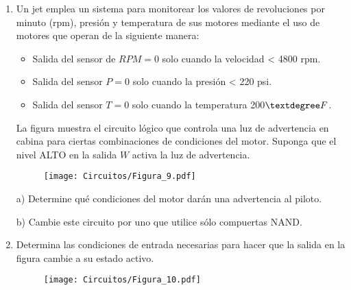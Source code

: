 \documentclass[a4paper, 12pt]{article}
\newcommand{\Aspace}{0.2cm}
\begin{document}
\begin{enumerate}
        \item Un jet emplea un sistema para monitorear los valores de revoluciones por minuto (rpm), presión y temperatura de sus motores mediante el uso de motores que operan de la siguiente manera:
        \begin{itemize}
            \item Salida del sensor de $RPM = 0$ solo cuando la velocidad < 4800 rpm.
            \item Salida del sensor $P = 0$ solo cuando la presión < 220 psi.
            \item Salida del sensor $T = 0$ solo cuando la temperatura 200$\textdegree F$.
        \end{itemize}
        La figura muestra el circuito lógico que controla una luz de advertencia en cabina para ciertas combinaciones de condiciones del motor. Suponga que el nivel ALTO en la salida $W$ activa la luz de advertencia.
        \begin{figure}[!ht]
            \centering
            \texttt{[image: Circuitos/Figura\_9.pdf]}
        \end{figure}
            \vspace{\Aspace} \par
            a) Determine qué condiciones del motor darán una advertencia al piloto.
            \\ { \color{azul}  }

            \vspace{\Aspace} \par
            b) Cambie este circuito por uno que utilice sólo compuertas NAND.
            \\ { \color{azul}  }



        \item Determina las condiciones de entrada necesarias para hacer que la salida en la figura cambie a su estado activo.
        \begin{figure}[!ht]
            \centering
            \texttt{[image: Circuitos/Figura\_10.pdf]}
        \end{figure}
            \vspace{\Aspace} \par
            { \color{azul}  }




\end{enumerate}
\end{document}
